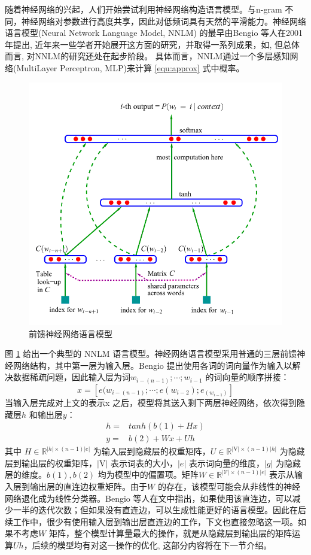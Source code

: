 \documentclass[12pt,a4paper]{article}
\begin{document}
随着神经网络的兴起，人们开始尝试利用神经网络构造语言模型。与n-gram 不同，神经网络对参数进行高度共享，因此对低频词具有天然的平滑能力。神经网络语言模型(Neural Network Language Model, NNLM) 的最早由Bengio 等人在2001年提出\cite{DBLP:conf/nips/BengioDV00}, 近年来一些学者开始展开这方面的研究，并取得一系列成果，如\cite{DBLP:conf/acl/BaroniDK14,DBLP:journals/sigkdd/BellK07,DBLP:journals/pami/BengioCV13,DBLP:journals/tnn/BengioSF94}, 但总体而言, 对NNLM的研究还处在起步阶段。
具体而言，NNLM通过一个多层感知网络(MultiLayer Perceptron, MLP)来计算 \ref{equ:approx} 式中概率。
\begin{figure}
  \centering
  \includegraphics[width=0.7\linewidth]{./figures/nplm.png}
  \caption{前馈神经网络语言模型}\label{fig:nplm}
\end{figure}
图 \ref{fig:nplm} 给出一个典型的 NNLM 语言模型。神经网络语言模型采用普通的三层前馈神经网络结构，其中第一层为输入层。Bengio 提出使用各词的词向量作为输入以解决数据稀疏问题，因此输入层为词$w_{i-(n-1)}; \cdots;w_{i-1} $ 的词向量的顺序拼接：
\begin{equation}\label{equ:we}
  x = [e(w_{i-(n-1)}; \cdots ; e(w_{i-2}); e_{(w_{i-1})}]
\end{equation}
当输入层完成对上文的表示x 之后，模型将其送入剩下两层神经网络，依次得到隐藏层$h$ 和输出层$y$：
\begin{equation}\label{equ:all_nplm}
\begin{split}
h =& tanh(b(1) + Hx) \\
y =& b(2) +Wx + Uh
\end{split}
\end{equation}
其中 $H \in \mathbb{R}^{|h| \times (n-1)|e|}$ 为输入层到隐藏层的权重矩阵，$U \in \mathbb{R}^{|\mathrm{V}|\times (n-1)|h|}$ 为隐藏层到输出层的权重矩阵，$ |\mathrm{V}|$ 表示词表的大小，$|e|$ 表示词向量的维度，$|g|$ 为隐藏层的维度。$b(1),b(2)$ 均为模型中的偏置项。矩阵$W \in \mathbb{R}^{|\mathcal{V}|\times (n-1)|e|}$ 表示从输入层到输出层的直连边权重矩阵。由于$W$ 的存在，该模型可能会从非线性的神经网络退化成为线性分类器。Bengio 等人在文中指出，如果使用该直连边，可以减少一半的迭代次数；但如果没有直连边，可以生成性能更好的语言模型。因此在后续工作中，很少有使用输入层到输出层直连边的工作，下文也直接忽略这一项。如果不考虑$W$ 矩阵，整个模型计算量最大的操作，就是从隐藏层到输出层的矩阵运算$Uh$，后续的模型均有对这一操作的优化, 这部分内容将在下一节介绍。
\end{document}
